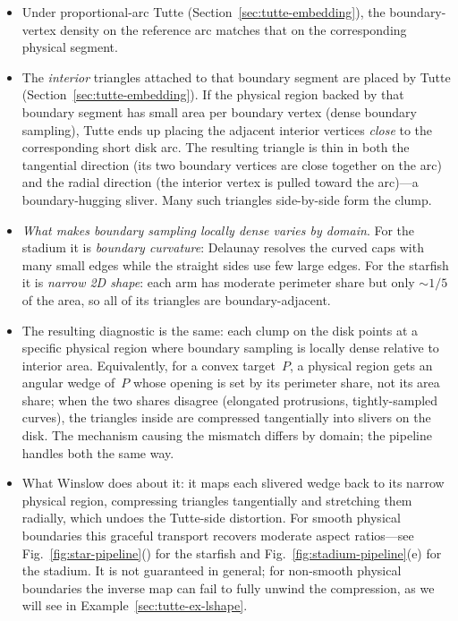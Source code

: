 \documentclass[11pt]{article}
\begin{document}
\begin{itemize}
  \item Under proportional-arc Tutte
    (Section~\ref{sec:tutte-embedding}), the boundary-vertex
    density on the reference arc matches that on the
    corresponding physical segment.
  \item The \emph{interior} triangles attached to that
    boundary segment are placed by Tutte
    (Section~\ref{sec:tutte-embedding}). If the physical
    region backed by that boundary segment has small area per
    boundary vertex (dense boundary sampling), Tutte ends up
    placing the adjacent interior vertices \emph{close} to the
    corresponding short disk arc. The resulting triangle is
    thin in both the tangential direction (its two boundary
    vertices are close together on the arc) and the radial
    direction (the interior vertex is pulled toward the arc)---a
    boundary-hugging sliver. Many such triangles side-by-side
    form the clump.
  \item \emph{What makes boundary sampling locally dense
    varies by domain}. For the stadium it is
    \emph{boundary curvature}: Delaunay resolves the curved
    caps with many small edges while the straight sides use
    few large edges. For the starfish it is
    \emph{narrow 2D shape}: each arm has moderate perimeter
    share but only $\sim 1/5$ of the area, so all of its
    triangles are boundary-adjacent.
  \item The resulting diagnostic is the same: each clump on
    the disk points at a specific physical region where
    boundary sampling is locally dense relative to interior
    area. Equivalently, for a convex target~$P$, a physical
    region gets an angular wedge of~$P$ whose opening is set
    by its perimeter share, not its area share; when the two
    shares disagree (elongated protrusions, tightly-sampled
    curves), the triangles inside are compressed tangentially
    into slivers on the disk. The mechanism causing the
    mismatch differs by domain; the pipeline handles both the
    same way.
  \item What Winslow does about it: it maps each slivered
    wedge back to its narrow physical region, compressing
    triangles tangentially and stretching them radially, which
    undoes the Tutte-side distortion. For smooth physical
    boundaries this graceful transport recovers moderate
    aspect ratios---see
    Fig.~\ref{fig:star-pipeline}()
    for the starfish and Fig.~\ref{fig:stadium-pipeline}(e)
    for the stadium. It is not guaranteed in general; for
    non-smooth physical boundaries the inverse map can fail
    to fully unwind the compression, as we will see in
    Example~\ref{sec:tutte-ex-lshape}.
\end{itemize}
\end{document}
